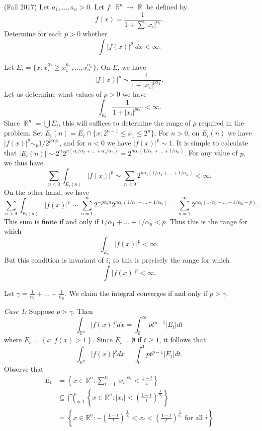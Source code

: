 \documentclass[answers]{exam}
\DeclareMathOperator{\RR}{\mathbb{R}}
\theoremstyle{problemstyle}
\newcommand{\vt}{\vskip 5mm} %
\newcommand{\1}[1]{\textbf{1}_{\left[#1\right]}} %
\def\R{\mathbb{R}} %
\begin{document}
\begin{questions}
\question (Fall 2017) Let $a_1, \dots, a_n > 0$. Let $f: \RR^n \to \RR$ be defined by
%
\[ f(x) = \frac{1}{1 + \sum |x_i|^{\alpha_i}}. \]
%
Determine for each $p > 0$ whether
%
\[ \int |f(x)|^p\; dx < \infty. \]
\begin{solution}
	Let $E_i = \{ x: x_i^{\alpha_i} \geq x_1^{\alpha_1}, \dots, x_n^{\alpha_n} \}$. On $E$, we have
	\[ |f(x)|^p \sim \frac{1}{1 + |x_i|^{p \alpha_1}}. \]
	Let us determine what values of $p > 0$ we have
	\[ \int_{E_i} \frac{1}{1 + |x_i|^{p \alpha_1}} < \infty.  \]
	Since $\RR^n = \bigcup E_i$, this will suffices to determine the range of $p$ required in the problem. Set $E_i(n) = E_i \cap \{ x : 2^{n-1} \leq x_1 \leq 2^n \}$. For $n > 0$, on $E_i(n)$ we have $|f(x)|^p \sim_p 1/2^{p \alpha_i n}$, and for $n < 0$ we have $|f(x)|^p \sim 1$. It is simple to calculate that $|E_i(n)| \sim 2^n 2^{n(\alpha_i/\alpha_2 + \dots + \alpha_i / \alpha_n)} = 2^{n \alpha_i (1/\alpha_1 + \dots + 1/\alpha_n)}$. For any value of $p$, we thus have
	\[ \sum_{n \leq 0} \int_{E_i(n)} |f(x)|^p \sim \sum_{n < 0} 2^{n \alpha_i (1/\alpha_1 + \dots + 1/\alpha_n)} < \infty. \]
	On the other hand, we have
	\[ \sum_{n > 0} \int_{E_i(n)} |f(x)|^p \sim \sum_{n = 1}^\infty 2^{-p\alpha_i n} 2^{n \alpha_i(1/\alpha_1 + \dots + 1/\alpha_n)} = \sum_{n = 1}^\infty 2^{n \alpha_i(1/\alpha_1 + \dots + 1/\alpha_n -p)}. \]
	This sum is finite if and only if $1/\alpha_1 + \dots + 1/\alpha_n < p$. Thus this is the range for which
	\[ \int_{E_i} |f(x)|^p < \infty. \]
	But this condition is invariant of $i$, so this is precisely the range for which
	\[ \int |f(x)|^p < \infty. \]
\end{solution}

\begin{solution}

Let $\gamma=\frac{1}{\alpha_{1}}+\ldots+\frac{1}{\alpha_{n}}$. We claim the integral converges if and only if $p>\gamma$.

\vt
\textit{Case 1:} Suppose $p>\gamma$. Then
\begin{equation*}
  \int_{\R^{n}} |f(x)|^{p}dx = \int_{0}^{\infty}p t^{p-1}|E_{t}|dt
\end{equation*}
where $E_{t}= \left\{ x: f(x)>1 \right\}$. Since $E_{t}=\emptyset$ if $t\geq 1$, it follows that
\begin{equation}\label{eq:10000}
  \int_{\R^{n}} |f(x)|^{p}dx = \int_{0}^{1}p t^{p-1}|E_{t}|dt.
\end{equation}
Observe that
\begin{align*}
  E_{t}
  &= \left\{ x\in \R^{n} : \sum_{i=1}^{n}|x_{i}|^{\alpha_{i}}< \frac{1-t}{t} \right\} \\
  &\subseteq \bigcap_{i=1}^{n}\left\{ x\in \R^{n}: |x_{i}| < \left(\frac{1-t}{t}\right)^{\frac{1}{\alpha_{i}}} \right\}\\
  &= \left\{ x\in \R^{n}:  -\left(\frac{1-t}{t}\right)^{\frac{1}{\alpha_{i}}} < x_{i}< \left(\frac{1-t}{t}\right)^{\frac{1}{\alpha_{i}}} \text{ for all }i\right\}
\end{align*}


\end{solution}
\end{questions}
\end{document}
